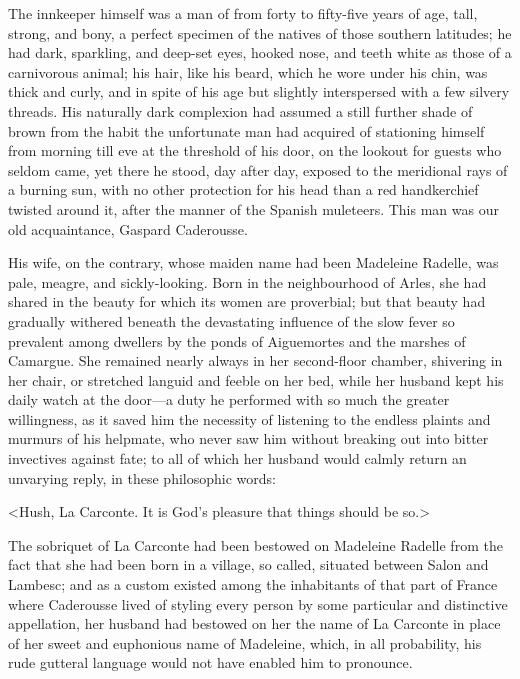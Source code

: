  The innkeeper himself was a man of from forty to fifty-five years of age, tall, strong, and bony, a perfect specimen of the natives of those southern latitudes; he had dark, sparkling, and deep-set eyes, hooked nose, and teeth white as those of a carnivorous animal; his hair, like his beard, which he wore under his chin, was thick and curly, and in spite of his age but slightly interspersed with a few silvery threads. His naturally dark complexion had assumed a still further shade of brown from the habit the unfortunate man had acquired of stationing himself from morning till eve at the threshold of his door, on the lookout for guests who seldom came, yet there he stood, day after day, exposed to the meridional rays of a burning sun, with no other protection for his head than a red handkerchief twisted around it, after the manner of the Spanish muleteers. This man was our old acquaintance, Gaspard Caderousse. 

 His wife, on the contrary, whose maiden name had been Madeleine Radelle, was pale, meagre, and sickly-looking. Born in the neighbourhood of Arles, she had shared in the beauty for which its women are proverbial; but that beauty had gradually withered beneath the devastating influence of the slow fever so prevalent among dwellers by the ponds of Aiguemortes and the marshes of Camargue. She remained nearly always in her second-floor chamber, shivering in her chair, or stretched languid and feeble on her bed, while her husband kept his daily watch at the door—a duty he performed with so much the greater willingness, as it saved him the necessity of listening to the endless plaints and murmurs of his helpmate, who never saw him without breaking out into bitter invectives against fate; to all of which her husband would calmly return an unvarying reply, in these philosophic words: 

 <Hush, La Carconte. It is God's pleasure that things should be so.> 

 The sobriquet of La Carconte had been bestowed on Madeleine Radelle from the fact that she had been born in a village, so called, situated between Salon and Lambesc; and as a custom existed among the inhabitants of that part of France where Caderousse lived of styling every person by some particular and distinctive appellation, her husband had bestowed on her the name of La Carconte in place of her sweet and euphonious name of Madeleine, which, in all probability, his rude gutteral language would not have enabled him to pronounce. 

